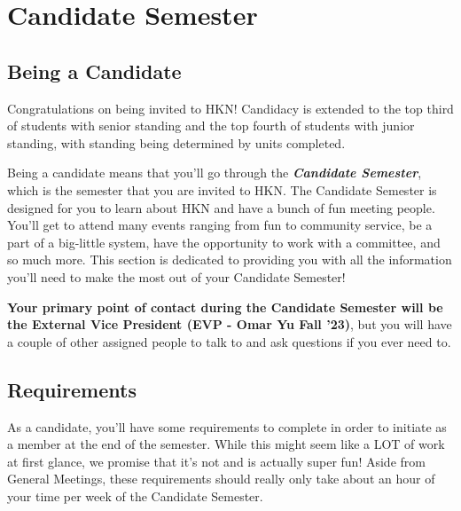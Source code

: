 \documentclass[11pt, article, oneside]{memoir}
\begin{document}
    \newpage
    \chapter{Candidate Semester}

    \section{Being a Candidate}
        Congratulations on being invited to HKN! Candidacy is extended to the top third of students with senior standing and the top fourth of students with junior standing, with standing being determined by units completed. 
        
        \bigbreak

        Being a candidate means that you'll go through the \textbf{\emph{Candidate Semester}}, which is the semester that you are invited to HKN. The Candidate Semester is designed for you to learn about HKN and have a bunch of fun meeting people. You'll get to attend many events ranging from fun to community service, be a part of a big-little system, have the opportunity to work with a committee, and so much more. This section is dedicated to providing you with all the information you'll need to make the most out of your Candidate Semester!

        \bigbreak

        \textbf{Your primary point of contact during the Candidate Semester will be the External Vice President (EVP - Omar Yu Fall '23)}, but you will have a couple of other assigned people to talk to and ask questions if you ever need to.


    \section{Requirements}
        As a candidate, you'll have some requirements to complete in order to initiate as a member at the end of the semester. While this might seem like a LOT of work at first glance, we promise that it's not and is actually super fun! Aside from  General Meetings, these requirements should really only take about an hour of your time per week of the Candidate Semester.
        
        \bigbreak
\end{document}
